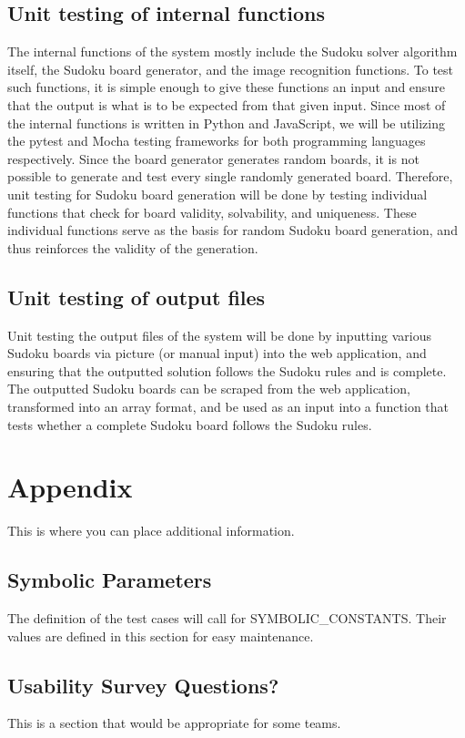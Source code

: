 \documentclass[11pt]{article}
\begin{document}
\subsection{Unit testing of internal functions}
The internal functions of the system mostly include the Sudoku solver algorithm itself, the Sudoku board generator, and the image recognition functions. To test such functions, it is simple enough to give these functions an input and ensure that the output is what is to be expected from that given input. Since most of the internal functions is written in Python and JavaScript, we will be utilizing the pytest and Mocha testing frameworks for both programming languages respectively. Since the board generator generates random boards, it is not possible to generate and test every single randomly generated board. Therefore, unit testing for Sudoku board generation will be done by testing individual functions that check for board validity, solvability, and uniqueness. These individual functions serve as the basis for random Sudoku board generation, and thus reinforces the validity of the generation. 
		
\subsection{Unit testing of output files}		
Unit testing the output files of the system will be done by inputting various Sudoku boards via picture (or manual input) into the web application, and ensuring that the outputted solution follows the Sudoku rules and is complete. The outputted Sudoku boards can be scraped from the web application, transformed into an array format, and be used as an input into a function that tests whether a complete Sudoku board follows the Sudoku rules. 





\newpage

\section{Appendix}

This is where you can place additional information.

\subsection{Symbolic Parameters}

The definition of the test cases will call for SYMBOLIC\_CONSTANTS.
Their values are defined in this section for easy maintenance.

\subsection{Usability Survey Questions?}

This is a section that would be appropriate for some teams.
\end{document}
